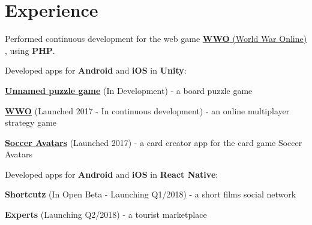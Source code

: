 \documentclass[a4paper]{deedy-resume} %
\begin{document}
\hfill
%
%
\begin{minipage}[t]{0.64\textwidth} %


\section{Experience}

\href{https://www.chilltime.com/}{}
\begin{tightitemize}
    \vspace{\topsep}
    \item Performed continuous development for the web game \href{https://www.worldwaronline.com/}{\textbf{WWO} (World War Online)} , using \textbf{PHP}.
    \item Developed apps for \textbf{Android} and \textbf{iOS} in \textbf{Unity}:
    \begin{innertightitemize}
        \item \href{https://www.chilltime.com/products/marble}{\textbf{Unnamed puzzle game}} (In Development) - a board puzzle game
        \item \href{https://www.worldwaronline.com/}{\textbf{WWO}} (Launched 2017 - In continuous development) - an online multiplayer strategy game
        \item \href{https://www.socceravatars.com/}{\textbf{Soccer Avatars}} (Launched 2017) - a card creator app for the card game Soccer Avatars
    \end{innertightitemize}
    \item Developed apps for \textbf{Android} and \textbf{iOS} in \textbf{React Native}:
    \begin{innertightitemize}
        \item \textbf{Shortcutz} (In Open Beta - Launching Q1/2018) - a short films social network
        \item \textbf{Experts} (Launching Q2/2018) - a tourist marketplace
    \end{innertightitemize}
\end{tightitemize}


\end{minipage}
\end{document}
